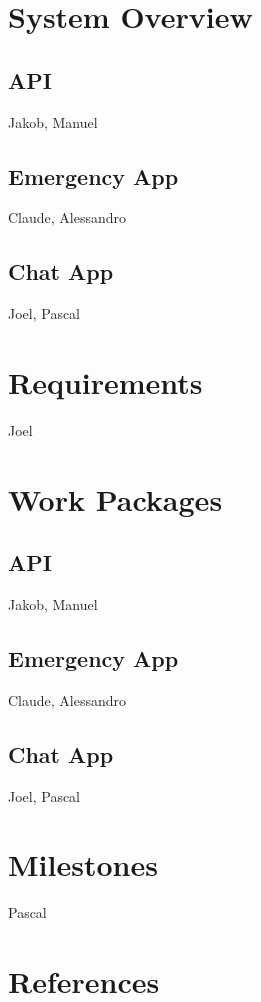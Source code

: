 \documentclass{report}
\newcommand{\rfig}[1]{Figure~\ref{fig:#1}}
\begin{document}
	\section{System Overview}
		\subsection{API}
		Jakob, Manuel
		
		\subsection{Emergency App}
		Claude, Alessandro
		
		\subsection{Chat App}
		Joel, Pascal
	
	\section{Requirements}
		Joel
	
	\section{Work Packages}
	
		\subsection{API}
			Jakob, Manuel
		
		\subsection{Emergency App}
			Claude, Alessandro
		
		\subsection{Chat App}
			Joel, Pascal
	
	\section{Milestones}
		Pascal
	
	\section{References}
	
	
	
	
\end{document}
